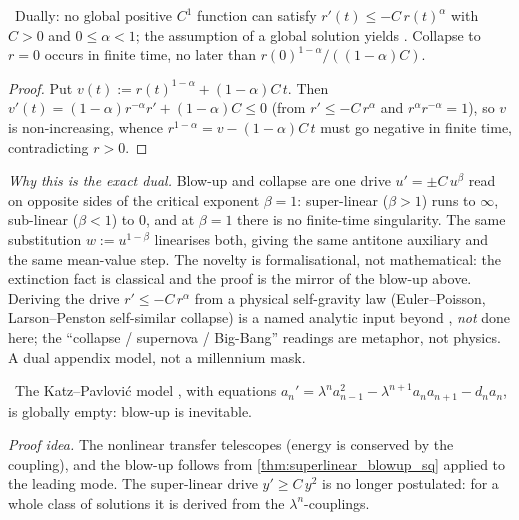 \begin{theorem}\label{thm:sublinear_collapse_extinction}
\green{}\ Dually: no global positive $C^1$ function can satisfy $r'(t) \le -C\,r(t)^{\alpha}$ with
$C>0$ and $0 \le \alpha < 1$; the assumption of a global solution yields . Collapse to
$r=0$ occurs in finite time, no later than $r(0)^{1-\alpha}/((1-\alpha)C)$.
\end{theorem}

\begin{proof}
Put $v(t) := r(t)^{1-\alpha} + (1-\alpha)C\,t$. Then
$v'(t) = (1-\alpha)r^{-\alpha}r' + (1-\alpha)C \le 0$ (from $r'\le -C\,r^{\alpha}$ and
$r^{\alpha}r^{-\alpha}=1$), so $v$ is non-increasing, whence $r^{1-\alpha} = v - (1-\alpha)C\,t$ must
go negative in finite time, contradicting $r>0$.
\end{proof}

\emph{Why this is the exact dual.} Blow-up and collapse are one drive $u' = \pm C\,u^{\beta}$ read on
opposite sides of the critical exponent $\beta=1$: super-linear ($\beta>1$) runs to $\infty$,
sub-linear ($\beta<1$) to $0$, and at $\beta=1$ there is no finite-time singularity. The same
substitution $w := u^{1-\beta}$ linearises both, giving the same antitone auxiliary and the same
mean-value step. The novelty is formalisational, not mathematical: the extinction fact is classical
and the proof is the mirror of the blow-up above. Deriving the drive $r'\le -C\,r^{\alpha}$ from a
physical self-gravity law (Euler--Poisson, Larson--Penston self-similar collapse) is a named
analytic input beyond , \emph{not} done here; the ``collapse / supernova / Big-Bang''
readings are metaphor, not physics. A dual appendix model, not a millennium mask.

\begin{theorem}\label{thm:dyadic_blowup}
\green{}\ The Katz--Pavlovi\'c model , with equations
$a_n' = \lambda^n a_{n-1}^2 - \lambda^{n+1} a_n a_{n+1} - d_n a_n$, is globally empty: blow-up is
inevitable. 
\end{theorem}

\emph{Proof idea.} The nonlinear transfer telescopes (energy is conserved by the coupling), and the
blow-up follows from \cref{thm:superlinear_blowup_sq} applied to the leading mode. The super-linear
drive $y' \ge C\,y^2$ is no longer postulated: for a whole class of solutions it is derived from the
$\lambda^n$-couplings.

